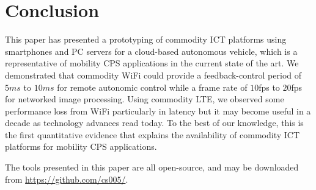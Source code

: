 \section{Conclusion}
\label{sec:conclusion}

This paper has presented a prototyping of commodity ICT platforms using
smartphones and PC servers for a cloud-based autonomous vehicle, which
is a representative of mobility CPS applications in the current state of
the art.
We demonstrated that commodity WiFi could provide a feedback-control
period of $5ms$ to $10ms$ for remote autonomic control while a frame
rate of $10$fps to $20$fps for networked image processing.
Using commodity LTE, we observed some performance loss from WiFi
particularly in latency but it may become useful in a decade as
technology advances read today.
To the best of our knowledge, this is the first quantitative evidence
that explains the availability of commodity ICT platforms for mobility
CPS applications.

The tools presented in this paper are all open-source, and may be
downloaded from \url{https://github.com/cs005/}.
